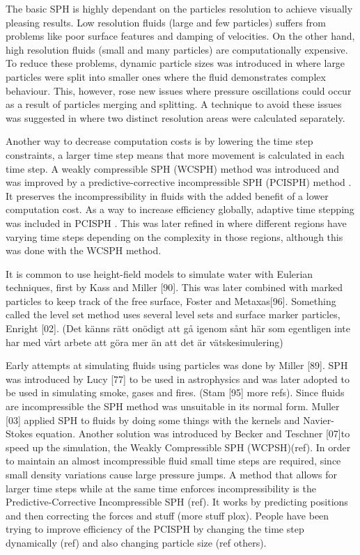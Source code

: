 \documentclass[../../main.tex]{subfiles}
\begin{document}
The basic SPH \cite{muller2003particle} is highly dependant on the particles resolution to achieve visually pleasing results. Low resolution fluids (large and few particles) suffers from problems like poor surface features and damping of velocities. On the other hand, high resolution fluids (small and many particles) are computationally expensive. To reduce these problems, dynamic particle sizes was introduced in \cite{adams2007adaptively} where large particles were split into smaller ones where the fluid demonstrates complex behaviour. This, however, rose new issues where pressure oscillations could occur as a result of particles merging and splitting. A technique to avoid these issues was suggested in \cite{solenthaler2011two} where two distinct resolution areas were calculated separately.

Another way to decrease computation costs is by lowering the time step constraints, a larger time step means that more movement is calculated in each time step. A weakly compressible SPH (WCSPH) method \cite{monaghan2005smoothed,becker2007weakly} was introduced and was improved by a predictive-corrective incompressible SPH (PCISPH) method \cite{solenthaler2009predictive}. It preserves the incompressibility in fluids with the added benefit of a lower computation cost. As a way to increase efficiency globally, adaptive time stepping was included in PCISPH \cite{ihmsen2010boundary}. This was later refined in \cite{goswami2014regional} where different regions have varying time steps depending on the complexity in those regions, although this was done with the WCSPH method. 

It is common to use height-field models to simulate water with Eulerian techniques, first by Kass and Miller [90]. This was later combined with marked particles to keep track of the free surface, Foster and Metaxas[96]. Something called the level set method uses several level sets and surface marker particles, Enright [02]. (Det känns rätt onödigt att gå igenom sånt här som egentligen inte har med vårt arbete att göra mer än att det är vätskesimulering)

Early attempts at simulating fluids using particles was done by Miller [89]. 
SPH was introduced by Lucy [77] to be used in astrophysics and was later adopted to be used in simulating smoke, gases and fires. (Stam [95] more refs). Since fluids are incompressible the SPH method was unsuitable in its normal form. Muller [03] applied SPH to fluids by doing some things with the kernels and Navier-Stokes equation. Another solution was introduced by Becker and Teschner [07]to speed up the simulation, the Weakly Compressible SPH (WCPSH)(ref). In order to maintain an almost incompressible fluid small time steps are required, since small density variations cause large pressure jumps. A method that allows for larger time steps while at the same time enforces incompressibility is the Predictive-Corrective Incompressible SPH (ref). It works by predicting positions and then correcting the forces and stuff (more stuff plox). People have been trying to improve efficiency of the PCISPH by changing the time step dynamically (ref) and also changing particle size (ref others). 
\end{document}
